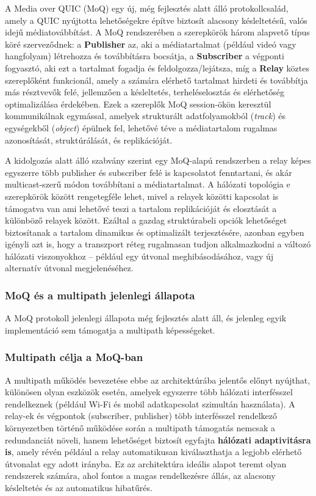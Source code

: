 \documentclass[a4paper,oneside]{article}
\begin{document}
A Media over QUIC (MoQ) egy új, még fejlesztés alatt álló protokollcsalád, 
amely a QUIC nyújtotta lehetőségekre építve biztosít alacsony késleltetésű, 
valós idejű médiatovábbítást. A MoQ rendszerében a szerepkörök három alapvető 
típus köré szerveződnek: a \textbf{Publisher} az, aki a médiatartalmat (például 
videó vagy hangfolyam) létrehozza és továbbításra bocsátja, a \textbf{Subscriber} 
a végponti fogyasztó, aki ezt a tartalmat fogadja és feldolgozza/lejátsza, míg a \textbf{Relay} 
köztes szereplőként funkcionál, amely a számára elérhető tartalmat hirdeti és 
továbbítja más résztvevők felé, jellemzően a késleltetés, terheléselosztás 
és elérhetőség optimalizálása érdekében. 
Ezek a szereplők MoQ session-ökön keresztül kommunikálnak egymással, amelyek 
strukturált adatfolyamokból (\emph{track}) és egységekből (\emph{object}) épülnek 
fel, lehetővé téve a médiatartalom rugalmas azonosítását, struktúrálását, és replikációját.

A kidolgozás alatt álló szabvány szerint egy MoQ-alapú rendszerben a relay képes 
egyszerre több publisher és subscriber felé is kapcsolatot fenntartani, 
és akár multicast-szerű módon továbbítani a médiatartalmat. 
A hálózati topológia e szerepkörök között rengetegféle lehet, mivel 
a relayek közötti kapcsolat is támogatva van ami lehetővé teszi
a tartalom replikációját és elosztását a különböző relayek között. 
Ezáltal a gazdag struktúrabeli opciók lehetőséget biztosítanak a tartalom dinamikus 
és optimalizált terjesztésére, azonban egyben igényli azt is, hogy a transzport 
réteg rugalmasan tudjon alkalmazkodni a változó hálózati viszonyokhoz – például 
egy útvonal meghibásodásához, vagy új alternatív útvonal megjelenéséhez.

\subsubsection{MoQ és a multipath jelenlegi állapota}

A MoQ protokoll jelenlegi állapota még fejlesztés alatt áll, és jelenleg egyik implementáció
sem támogatja a multipath képességeket.

\subsubsection{Multipath célja a MoQ-ban}

A multipath működés bevezetése ebbe az architektúrába jelentős előnyt nyújthat, 
különösen olyan eszközök esetén, amelyek egyszerre több hálózati interfésszel 
rendelkeznek (például Wi-Fi és mobil adatkapcsolat szimultán használata). A relay-ek és végpontok 
(subscriber, publisher) több interfésszel rendelkező környezetben 
történő működése során a multipath támogatás nemcsak a redundanciát növeli, hanem 
lehetőséget biztosít egyfajta \textbf{hálózati adaptivitásra is}, amely révén például 
a relay automatikusan kiválaszthatja a legjobb elérhető útvonalat egy adott irányba. 
Ez az architektúra ideális alapot teremt olyan rendszerek számára, ahol fontos a magas 
rendelkezésre állás, az alacsony késleltetés és az automatikus hibatűrés.
\end{document}
